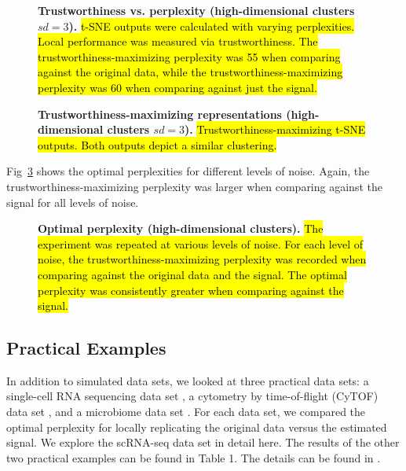 \documentclass[10pt,letterpaper]{article}
\begin{document}
\begin{figure}[!h]
\caption{{\bf Trustworthiness vs. perplexity (high-dimensional clusters $sd = 3$).}
\hl{t-SNE outputs were calculated with varying perplexities. Local performance was measured via trustworthiness. The trustworthiness-maximizing perplexity was 55 when comparing against the original data, while the trustworthiness-maximizing perplexity was 60 when comparing against just the signal.}}
\label{fig6}
\end{figure}

\begin{figure}[!h]
\caption{{\bf Trustworthiness-maximizing representations (high-dimensional clusters $sd = 3$).}
\hl{Trustworthiness-maximizing t-SNE outputs. Both outputs depict a similar clustering.}}
\label{fig7}
\end{figure}

Fig~\ref{fig8} shows the optimal perplexities for different levels of noise. Again, the trustworthiness-maximizing perplexity was larger when comparing against the signal for all levels of noise.

\begin{figure}[!h]
\caption{{\bf Optimal perplexity (high-dimensional clusters).}
\hl{The experiment was repeated at various levels of noise. For each level of noise, the trustworthiness-maximizing perplexity was recorded when comparing against the original data and the signal. The optimal perplexity was consistently greater when comparing against the signal.}}
\label{fig8}
\end{figure}

\subsection*{Practical Examples}
In addition to simulated data sets, we looked at three practical data sets: a single-cell RNA sequencing data set \cite{scRNA data}, a cytometry by time-of-flight (CyTOF) data set \cite{CyTOF data}, and a microbiome data set \cite{enterotype data}. For each data set, we compared the optimal perplexity for locally replicating the original data versus the estimated signal. We explore the scRNA-seq data set in detail here. The results of the other two practical examples can be found in Table 1. The details can be found in .
\end{document}
